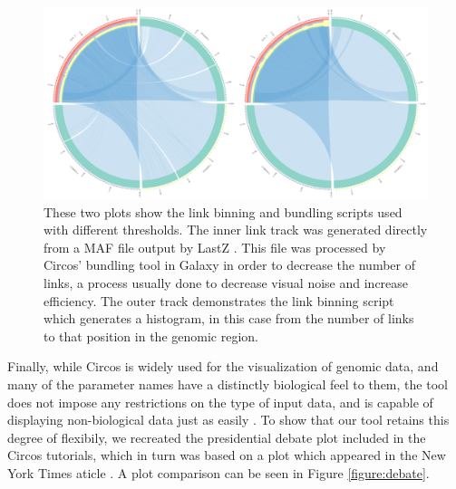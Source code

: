 \begin{figure}[h!]
\centering
\includegraphics[width=\linewidth]{chapters/images/circos/binning-bundling.png}
\caption{These two plots show the link binning and bundling scripts used with different thresholds. The inner link track was generated directly from a MAF file output by LastZ \cite{rahmani2011lastz}. This file was processed by Circos' bundling tool in Galaxy in order to decrease the number of links, a process usually done to decrease visual noise and increase efficiency. The outer track demonstrates the link binning script which generates a histogram, in this case from the number of links to that position in the genomic region.}
\label{figure:binning-bundling}
\end{figure}

Finally, while Circos is widely used for the visualization of genomic data, and many of the parameter names have a distinctly biological feel to them, the tool does not impose any restrictions on the type of input data, and is capable of displaying non-biological data just as easily \cite{circosnongenomic}. To show that our tool retains this degree of flexibily, we recreated the presidential debate plot included in the Circos tutorials, which in turn was based on a plot which appeared in the New York Times aticle \cite{namingnames}. A plot comparison can be seen in Figure \ref{figure:debate}.

